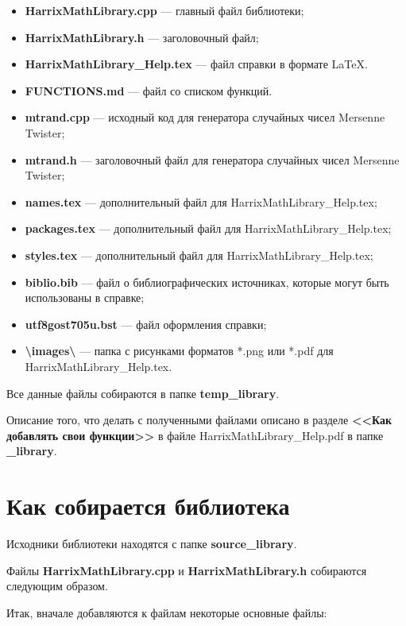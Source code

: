 \documentclass[a4paper,12pt]{article}
\begin{document}
\begin{itemize}
\item \textbf{HarrixMathLibrary.cpp} --- главный файл библиотеки;
\item \textbf{HarrixMathLibrary.h} --- заголовочный файл;\\
\item \textbf{HarrixMathLibrary\_Help.tex} --- файл справки в формате \LaTeX.
\item \textbf{FUNCTIONS.md} --- файл со списком функций.
\item \textbf{mtrand.cpp} --- исходный код для генератора случайных чисел Mersenne Twister;
\item \textbf{mtrand.h} --- заголовочный файл для генератора случайных чисел Mersenne Twister;
\item \textbf{names.tex} --- дополнительный файл для HarrixMathLibrary\_Help.tex;
\item \textbf{packages.tex} --- дополнительный файл для HarrixMathLibrary\_Help.tex;
\item \textbf{styles.tex} --- дополнительный файл для HarrixMathLibrary\_Help.tex;
\item \textbf{biblio.bib} --- файл о библиографических источниках, которые могут быть использованы в справке;
\item \textbf{utf8gost705u.bst} --- файл оформления справки;
\item \textbf{\textbackslash images\textbackslash} --- папка с рисунками форматов *.png или *.pdf для HarrixMathLibrary\_Help.tex.
\end{itemize}

Все данные файлы собираются в папке \textbf{temp\_library}.

Описание того, что делать с полученными файлами описано в разделе \textbf{<<Как добавлять свои функции>>} в файле HarrixMathLibrary\_Help.pdf в папке \textbf{\_library}.

\section{Как собирается библиотека}
Исходники библиотеки находятся с папке \textbf{source\_library}.

Файлы \textbf{HarrixMathLibrary.cpp} и \textbf{HarrixMathLibrary.h} собираются следующим образом.

Итак, вначале добавляются к файлам некоторые основные файлы:
\end{document}
